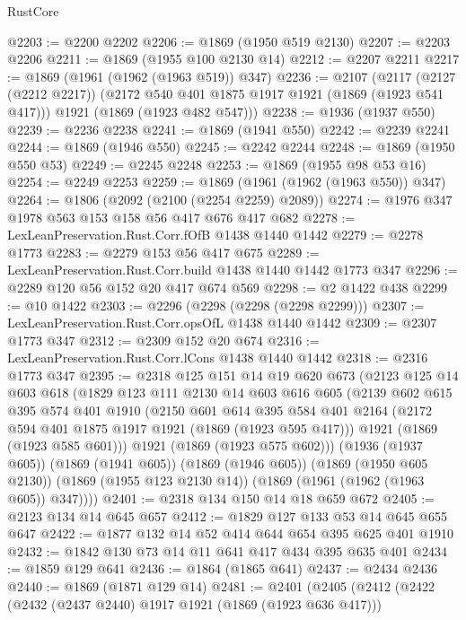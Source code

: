 \begin{lexlean}{RustCore}
\begin{coremodule}
@2203 := @2200 @2202
@2206 := @1869 (@1950 @519 @2130)
@2207 := @2203 @2206
@2211 := @1869 (@1955 @100 @2130 @14)
@2212 := @2207 @2211
@2217 := @1869 (@1961 (@1962 (@1963 @519)) @347)
@2236 := @2107
    (@2117
      (@2127 (@2212 @2217))
      (@2172 @540 @401 @1875 @1917 @1921 (@1869 (@1923 @541 @417)))
      @1921
      (@1869 (@1923 @482 @547)))
@2238 := @1936 (@1937 @550)
@2239 := @2236 @2238
@2241 := @1869 (@1941 @550)
@2242 := @2239 @2241
@2244 := @1869 (@1946 @550)
@2245 := @2242 @2244
@2248 := @1869 (@1950 @550 @53)
@2249 := @2245 @2248
@2253 := @1869 (@1955 @98 @53 @16)
@2254 := @2249 @2253
@2259 := @1869 (@1961 (@1962 (@1963 @550)) @347)
@2264 := @1806 (@2092 (@2100 (@2254 @2259) @2089))
@2274 := @1976 @347 @1978 @563 @153 @158 @56 @417 @676 @417 @682
@2278 := LexLeanPreservation.Rust.Corr.fOfB @1438 @1440 @1442
@2279 := @2278 @1773
@2283 := @2279 @153 @56 @417 @675
@2289 := LexLeanPreservation.Rust.Corr.build @1438 @1440 @1442 @1773 @347
@2296 := @2289 @120 @56 @152 @20 @417 @674 @569
@2298 := @2 @1422 @438
@2299 := @10 @1422
@2303 := @2296 (@2298 (@2298 (@2298 @2299)))
@2307 := LexLeanPreservation.Rust.Corr.opsOfL @1438 @1440 @1442
@2309 := @2307 @1773 @347
@2312 := @2309 @152 @20 @674
@2316 := LexLeanPreservation.Rust.Corr.lCons @1438 @1440 @1442
@2318 := @2316 @1773 @347
@2395 := @2318
    @125
    @151
    @14
    @19
    @620
    @673
    (@2123
      @125
      @14
      @603
      @618
      (@1829
        @123
        @111
        @2130
        @14
        @603
        @616
        @605
        (@2139
          @602
          @615
          @395
          @574
          @401
          @1910
          (@2150
            @601
            @614
            @395
            @584
            @401
            @2164
            (@2172 @594 @401 @1875 @1917 @1921 (@1869 (@1923 @595 @417)))
            @1921
            (@1869 (@1923 @585 @601)))
          @1921
          (@1869 (@1923 @575 @602)))
        (@1936 (@1937 @605))
        (@1869 (@1941 @605))
        (@1869 (@1946 @605))
        (@1869 (@1950 @605 @2130))
        (@1869 (@1955 @123 @2130 @14))
        (@1869 (@1961 (@1962 (@1963 @605)) @347))))
@2401 := @2318 @134 @150 @14 @18 @659 @672
@2405 := @2123 @134 @14 @645 @657
@2412 := @1829 @127 @133 @53 @14 @645 @655 @647
@2422 := @1877 @132 @14 @52 @414 @644 @654 @395 @625 @401 @1910
@2432 := @1842 @130 @73 @14 @11 @641 @417 @434 @395 @635 @401
@2434 := @1859 @129 @641
@2436 := @1864 (@1865 @641)
@2437 := @2434 @2436
@2440 := @1869 (@1871 @129 @14)
@2481 := @2401
    (@2405
      (@2412
        (@2422
          (@2432 (@2437 @2440) @1917 @1921 (@1869 (@1923 @636 @417)))

\end{coremodule}
\end{lexlean}
